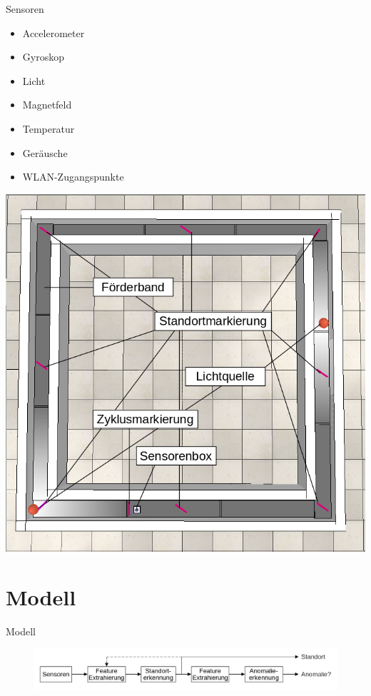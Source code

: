 \documentclass[10pt]{beamer}
\begin{document}
\begin{frame}{Sensoren}
\begin{minipage}{.5\textwidth}
    \begin{itemize}
        \item Accelerometer
        \item Gyroskop
        \item Licht
        \color{red}
        \item Magnetfeld
        \item Temperatur
        \item Geräusche
        \item WLAN-Zugangspunkte
    \end{itemize}
\end{minipage}%
\begin{minipage}{.5\textwidth}
    \centering
    \includegraphics[width=\linewidth]{model/simple_square_labeled.png} 
\end{minipage}
\end{frame}

\section{Modell}
\begin{frame}{Modell}
    \begin{figure}
        \centering
        \includegraphics[width=\linewidth]{model/model_idea.png}
    \end{figure}
\end{frame}
\end{document}
